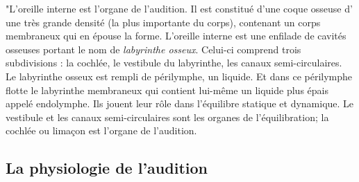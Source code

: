 "L'oreille interne est l'organe de l'audition. Il
est constitué d'une coque osseuse d' une très grande densité (la plus
importante du corps), contenant un corps membraneux qui en épouse
la forme.
L'oreille interne est une enfilade de cavités osseuses portant
le nom de \emph{labyrinthe osseux}. Celui-ci comprend trois subdivisions :
la cochlée, le vestibule du labyrinthe, les canaux semi-circulaires.
Le labyrinthe
osseux est rempli de périlymphe, un liquide. Et dans ce périlymphe
flotte le labyrinthe membraneux qui contient lui-même un liquide
plus épais appelé endolymphe. Ils jouent leur rôle dans l'équilibre
statique et dynamique. Le vestibule et les canaux semi-circulaires
sont les organes de l'équilibration; la cochlée ou
limaçon est l'organe de l'audition.



\subsection{La physiologie de l'audition}


